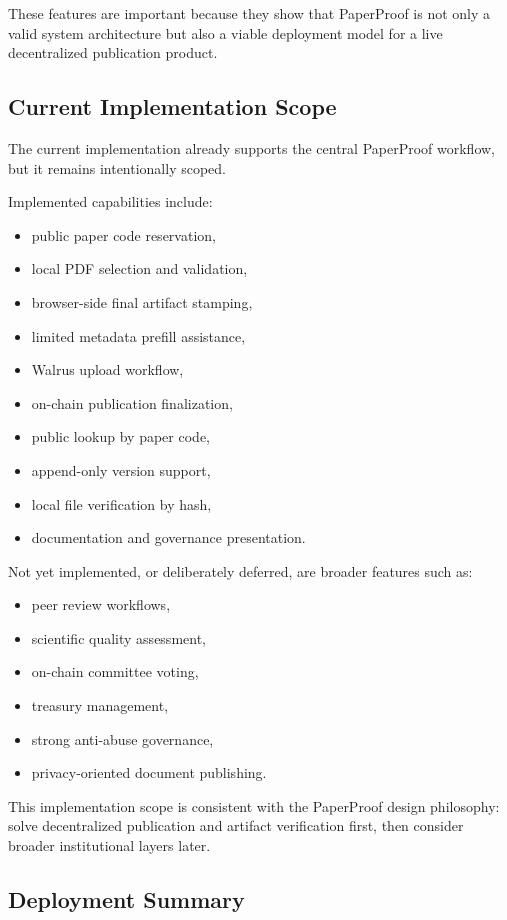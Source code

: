 \documentclass[journal]{IEEEtran}
\begin{document}
These features are important because they show that PaperProof is not only a valid system architecture but also a viable deployment model for a live decentralized publication product.

\subsection{Current Implementation Scope}

The current implementation already supports the central PaperProof workflow, but it remains intentionally scoped.

Implemented capabilities include:
\begin{itemize}
    \item public paper code reservation,
    \item local PDF selection and validation,
    \item browser-side final artifact stamping,
    \item limited metadata prefill assistance,
    \item Walrus upload workflow,
    \item on-chain publication finalization,
    \item public lookup by paper code,
    \item append-only version support,
    \item local file verification by hash,
    \item documentation and governance presentation.
\end{itemize}


Not yet implemented, or deliberately deferred, are broader features such as:
\begin{itemize}
    \item peer review workflows,
    \item scientific quality assessment,
    \item on-chain committee voting,
    \item treasury management,
    \item strong anti-abuse governance,
    \item privacy-oriented document publishing.
\end{itemize}


This implementation scope is consistent with the PaperProof design philosophy: solve decentralized publication and artifact verification first, then consider broader institutional layers later.

\subsection{Deployment Summary}
\end{document}
